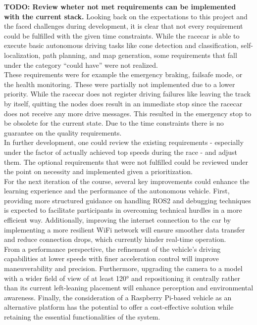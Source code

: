 \textbf{TODO: Review wheter not met requirements can be implemented with the current stack.}
Looking back on the expectations to this project and the faced challenges during development, it is clear that not every requirement could be fulfilled with the given time constraints. While the racecar is able to execute basic autonomous driving tasks like cone detection and classification, self-localization, path planning, and map generation, some requirements that fall under the category ``could have'' were not realized.\\
\newline
These requirements were for example the emergency braking, failsafe mode, or the health monitoring. These were partially not implemented due to a lower priority. While the racecar does not register driving failures like leaving the track by itself, quitting the nodes does result in an immediate stop since the racecar does not receive any more drive messages. This resulted in the emergency stop to be obsolete for the current state. Due to the time constraints there is no guarantee on the quality requirements. \\
\newline
In further development, one could review the existing requirements - especially under the factor of actually achieved top speeds during the race - and adjust them. The optional requirements that were not fulfilled could be reviewed under the point on necessity and implemented given a prioritization. \\
\newline
For the next iteration of the course, several key improvements could enhance the learning experience and the performance of the autonomous vehicle. First, providing more structured guidance on handling ROS2 and debugging techniques is expected to facilitate participants in overcoming technical hurdles in a more efficient way.
Additionally, improving the internet connection to the car by implementing a more resilient WiFi network will ensure smoother data transfer and reduce connection drops, which currently hinder real-time operation.\\ 
\newline
From a performance perspective, the refinement of the vehicle's driving capabilities at lower speeds with finer acceleration control will improve maneuverability and precision. 
Furthermore, upgrading the camera to a model with a wider field of view of at least 120° and repositioning it centrally rather than its current left-leaning placement will enhance perception and environmental awareness. 
Finally, the consideration of a Raspberry Pi-based vehicle as an alternative platform has the potential to offer a cost-effective solution while retaining the essential functionalities of the system.
